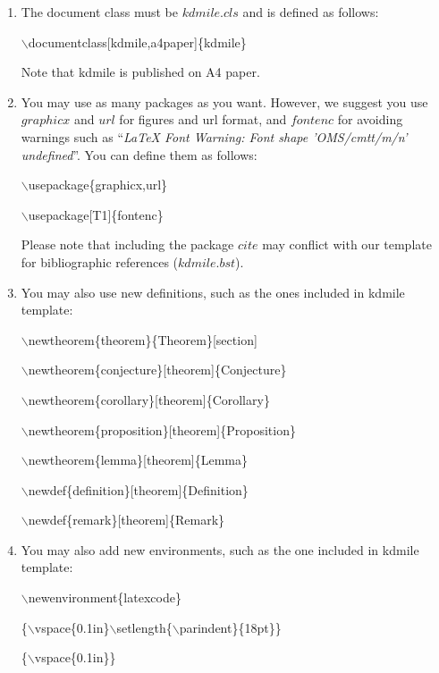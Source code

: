 \documentclass[kdmile,a4paper]{kdmile} %
\newenvironment{latexcode}
{\ttfamily\vspace{0.1in}\setlength{\parindent}{18pt}}
{\vspace{0.1in}}
\begin{document}
\begin{enumerate}
	\item The document class must be $kdmile.cls$ and is defined as follows:
	
				\begin{latexcode} 
		          $\backslash$documentclass[kdmile,a4paper]\{kdmile\}
		    \end{latexcode}
				
		\rmfamily Note that kdmile is published on A4 paper.

  \item You may use as many packages as you want. However, we suggest you use $graphicx$ and $url$ for figures and url format, and $fontenc$ for avoiding warnings such as ``\textit{LaTeX Font Warning: Font shape 'OMS/cmtt/m/n' undefined}''. You can define them as follows:
    
    	\begin{latexcode} 
				$\backslash$usepackage\{graphicx,url\} 
		
				$\backslash$usepackage[T1]\{fontenc\}\vspace{0.1in}
			\end{latexcode}
		
		Please note that including the package $cite$ may conflict with our template for bibliographic references ($kdmile.bst$).
	
	\item You may also use new definitions, such as the ones included in kdmile template:
	
	
			\begin{latexcode} 
		  $\backslash$newtheorem\{theorem\}\{Theorem\}[section] 
		  
			$\backslash$newtheorem\{conjecture\}[theorem]\{Conjecture\}
			
			$\backslash$newtheorem\{corollary\}[theorem]\{Corollary\}
			
			$\backslash$newtheorem\{proposition\}[theorem]\{Proposition\}
			
			$\backslash$newtheorem\{lemma\}[theorem]\{Lemma\}
			
			$\backslash$newdef\{definition\}[theorem]\{Definition\}
			
			$\backslash$newdef\{remark\}[theorem]\{Remark\}
			\end{latexcode}
			
	\item You may also add new environments, such as the one included in kdmile template:

		\begin{latexcode} 
				$\backslash$newenvironment\{latexcode\} 
				
		    \{$\backslash$vspace\{0.1in\}$\backslash$setlength\{$\backslash$parindent\}\{18pt\}\} 
		    
				\{$\backslash$vspace\{0.1in\}\}
		\end{latexcode}
		 		
\end{enumerate}
\end{document}
